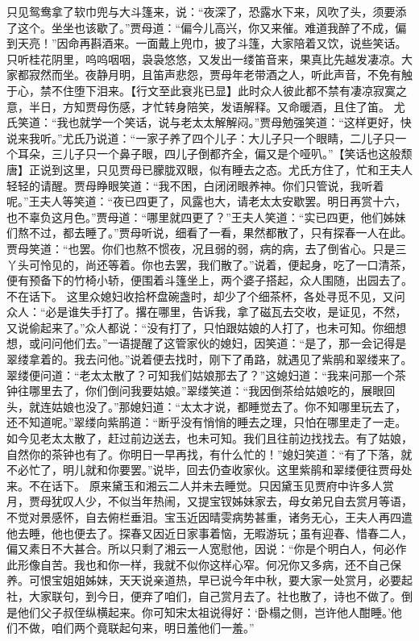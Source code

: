 \documentclass[12pt,oneside]{book}
\begin{document}
只见鸳鸯拿了软巾兜与大斗篷来，说：“夜深了，恐露水下来，风吹了头，须要添了这个。坐坐也该歇了。”贾母道：“偏今儿高兴，你又来催。难道我醉了不成，偏到天亮！”因命再斟酒来。一面戴上兜巾，披了斗篷，大家陪着又饮，说些笑话。只听桂花阴里，呜呜咽咽，袅袅悠悠，又发出一缕笛音来，果真比先越发凄凉。大家都寂然而坐。夜静月明，且笛声悲怨，贾母年老带酒之人，听此声音，不免有触于心，禁不住堕下泪来。【行文至此衰兆已显】此时众人彼此都不禁有凄凉寂寞之意，半日，方知贾母伤感，才忙转身陪笑，发语解释。又命暖酒，且住了笛。
尤氏笑道：“我也就学一个笑话，说与老太太解解闷。”贾母勉强笑道：“这样更好，快说来我听。”尤氏乃说道：“一家子养了四个儿子：大儿子只一个眼睛，二儿子只一个耳朵，三儿子只一个鼻子眼，四儿子倒都齐全，偏又是个哑叭。”【笑话也这般颓唐】正说到这里，只见贾母已朦胧双眼，似有睡去之态。尤氏方住了，忙和王夫人轻轻的请醒。贾母睁眼笑道：“我不困，白闭闭眼养神。你们只管说，我听着呢。”王夫人等笑道：“夜已四更了，风露也大，请老太太安歇罢。明日再赏十六，也不辜负这月色。”贾母道：“哪里就四更了？”王夫人笑道：“实已四更，他们姊妹们熬不过，都去睡了。”贾母听说，细看了一看，果然都散了，只有探春一人在此。贾母笑道：“也罢。你们也熬不惯夜，况且弱的弱，病的病，去了倒省心。只是三丫头可怜见的，尚还等着。你也去罢，我们散了。”说着，便起身，吃了一口清茶，便有预备下的竹椅小轿，便围着斗篷坐上，两个婆子搭起，众人围随，出园去了。不在话下。
这里众媳妇收拾杯盘碗盏时，却少了个细茶杯，各处寻觅不见，又问众人：“必是谁失手打了。撂在哪里，告诉我，拿了磁瓦去交收，是证见，不然，又说偷起来了。”众人都说：“没有打了，只怕跟姑娘的人打了，也未可知。你细想想，或问问他们去。”一语提醒了这管家伙的媳妇，因笑道：“是了，那一会记得是翠缕拿着的。我去问他。”说着便去找时，刚下了甬路，就遇见了紫鹃和翠缕来了。翠缕便问道：“老太太散了？可知我们姑娘那去了？”这媳妇道：“我来问那一个茶钟往哪里去了，你们倒问我要姑娘。”翠缕笑道：“我因倒茶给姑娘吃的，展眼回头，就连姑娘也没了。”那媳妇道：“太太才说，都睡觉去了。你不知哪里玩去了，还不知道呢。”翠缕向紫鹃道：“断乎没有悄悄的睡去之理，只怕在哪里走了一走。如今见老太太散了，赶过前边送去，也未可知。我们且往前边找找去。有了姑娘，自然你的茶钟也有了。你明日一早再找，有什么忙的！”媳妇笑道：“有了下落，就不必忙了，明儿就和你要罢。”说毕，回去仍查收家伙。这里紫鹃和翠缕便往贾母处来。不在话下。
原来黛玉和湘云二人并未去睡觉。只因黛玉见贾府中许多人赏月，贾母犹叹人少，不似当年热闹，又提宝钗姊妹家去，母女弟兄自去赏月等语，不觉对景感怀，自去俯栏垂泪。宝玉近因晴雯病势甚重，诸务无心，王夫人再四遣他去睡，他也便去了。探春又因近日家事着恼，无暇游玩；虽有迎春、惜春二人，偏又素日不大甚合。所以只剩了湘云一人宽慰他，因说：“你是个明白人，何必作此形像自苦。我也和你一样，我就不似你这样心窄。何况你又多病，还不自己保养。可恨宝姐姐姊妹，天天说亲道热，早已说今年中秋，要大家一处赏月，必要起社，大家联句，到今日，便弃了咱们，自己赏月去了。社也散了，诗也不做了。倒是他们父子叔侄纵横起来。你可知宋太祖说得好：‘卧榻之侧，岂许他人酣睡。’他们不做，咱们两个竟联起句来，明日羞他们一羞。”
\end{document}
